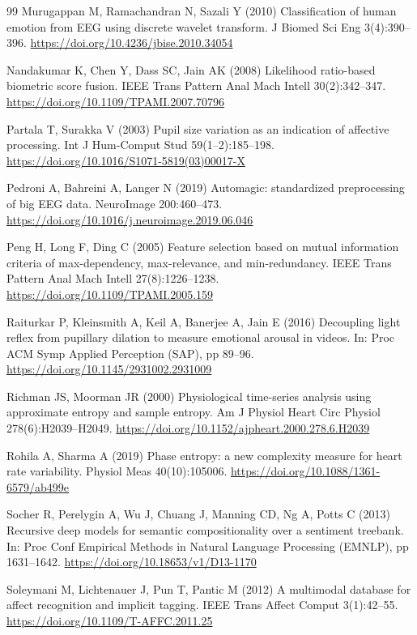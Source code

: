 \documentclass[11pt,a4paper]{article}
\begin{document}
\begin{thebibliography}{99}
 Murugappan M, Ramachandran N, Sazali Y (2010) Classification of human emotion from EEG using discrete wavelet transform. J Biomed Sci Eng 3(4):390--396. \url{https://doi.org/10.4236/jbise.2010.34054}

 Nandakumar K, Chen Y, Dass SC, Jain AK (2008) Likelihood ratio-based biometric score fusion. IEEE Trans Pattern Anal Mach Intell 30(2):342--347. \url{https://doi.org/10.1109/TPAMI.2007.70796}

 Partala T, Surakka V (2003) Pupil size variation as an indication of affective processing. Int J Hum-Comput Stud 59(1--2):185--198. \url{https://doi.org/10.1016/S1071-5819(03)00017-X}

 Pedroni A, Bahreini A, Langer N (2019) Automagic: standardized preprocessing of big EEG data. NeuroImage 200:460--473. \url{https://doi.org/10.1016/j.neuroimage.2019.06.046}

 Peng H, Long F, Ding C (2005) Feature selection based on mutual information criteria of max-dependency, max-relevance, and min-redundancy. IEEE Trans Pattern Anal Mach Intell 27(8):1226--1238. \url{https://doi.org/10.1109/TPAMI.2005.159}

 Raiturkar P, Kleinsmith A, Keil A, Banerjee A, Jain E (2016) Decoupling light reflex from pupillary dilation to measure emotional arousal in videos. In: Proc ACM Symp Applied Perception (SAP), pp 89--96. \url{https://doi.org/10.1145/2931002.2931009}

 Richman JS, Moorman JR (2000) Physiological time-series analysis using approximate entropy and sample entropy. Am J Physiol Heart Circ Physiol 278(6):H2039--H2049. \url{https://doi.org/10.1152/ajpheart.2000.278.6.H2039}

 Rohila A, Sharma A (2019) Phase entropy: a new complexity measure for heart rate variability. Physiol Meas 40(10):105006. \url{https://doi.org/10.1088/1361-6579/ab499e}

 Socher R, Perelygin A, Wu J, Chuang J, Manning CD, Ng A, Potts C (2013) Recursive deep models for semantic compositionality over a sentiment treebank. In: Proc Conf Empirical Methods in Natural Language Processing (EMNLP), pp 1631--1642. \url{https://doi.org/10.18653/v1/D13-1170}

 Soleymani M, Lichtenauer J, Pun T, Pantic M (2012) A multimodal database for affect recognition and implicit tagging. IEEE Trans Affect Comput 3(1):42--55. \url{https://doi.org/10.1109/T-AFFC.2011.25}


\end{thebibliography}
\end{document}
